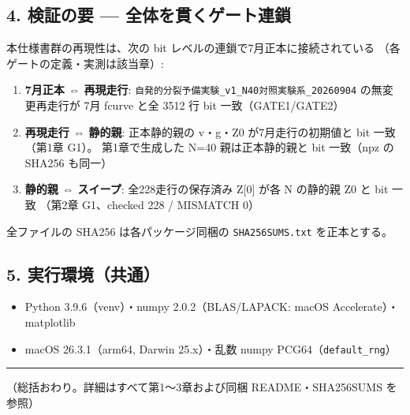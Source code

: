 \documentclass[
  a4paper,
]{ltjsarticle}
\providecommand{\tightlist}{%
  \setlength{\itemsep}{0pt}\setlength{\parskip}{0pt}}
\begin{document}
\subsection{4. 検証の要 ---
全体を貫くゲート連鎖}\label{ux691cux8a3cux306eux8981-ux5168ux4f53ux3092ux8cabux304fux30b2ux30fcux30c8ux9023ux9396}

本仕様書群の再現性は、次の bit レベルの連鎖で7月正本に接続されている
（各ゲートの定義・実測は該当章）:

\begin{enumerate}
\def\labelenumi{\arabic{enumi}.}
\tightlist
\item
  \textbf{7月正本 ⇔ 再現走行}:
  \texttt{自発的分裂予備実験\_v1\_N40対照実験系\_20260904}
  の無変更再走行が 7月 fcurve と全 3512 行 bit 一致（GATE1/GATE2）
\item
  \textbf{再現走行 ⇔ 静的親}: 正本静的親の v・g・Z0 が7月走行の初期値と
  bit 一致（第1章 G1）。 第1章で生成した N=40 親は正本静的親と bit
  一致（npz の SHA256 も同一）
\item
  \textbf{静的親 ⇔ スイープ}: 全228走行の保存済み Z{[}0{]} が各 N
  の静的親 Z0 と bit 一致 （第2章 G1、checked 228 / MISMATCH 0）
\end{enumerate}

全ファイルの SHA256 は各パッケージ同梱の \texttt{SHA256SUMS.txt}
を正本とする。

\subsection{5.
実行環境（共通）}\label{ux5b9fux884cux74b0ux5883ux5171ux901a}

\begin{itemize}
\tightlist
\item
  Python 3.9.6（venv）・numpy 2.0.2（BLAS/LAPACK: macOS
  Accelerate）・matplotlib
\item
  macOS 26.3.1（arm64, Darwin 25.x）・乱数 numpy
  PCG64（\texttt{default\_rng}）
\end{itemize}

\begin{center}\rule{0.5\linewidth}{0.5pt}\end{center}

（総括おわり。詳細はすべて第1〜3章および同梱 README・SHA256SUMS を参照）
\end{document}
